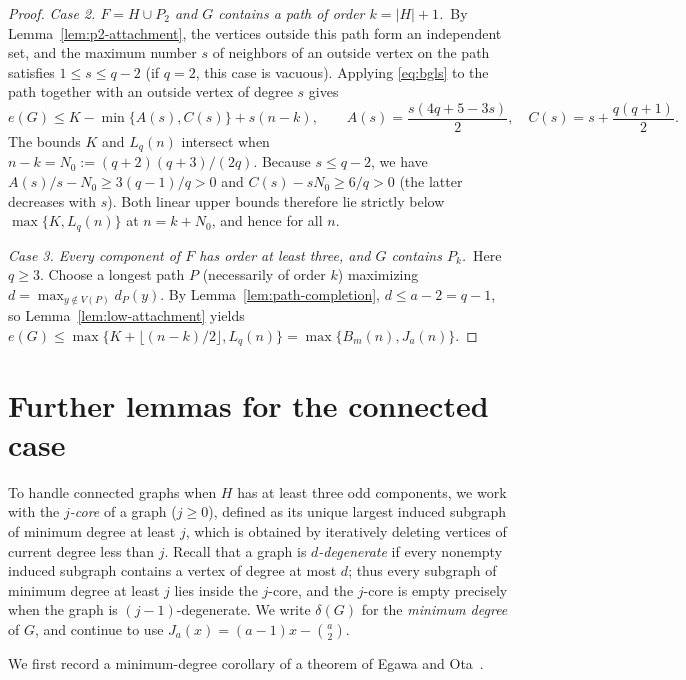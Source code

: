 \documentclass[10pt]{article}
\theoremstyle{compactplain}
\theoremstyle{remark}\newtheorem{remark}[theorem]{Remark}
\begin{document}
\begin{proof}
\medskip\noindent\emph{Case 2. $F=H\cup P_2$ and $G$ contains a path of
order $k=|H|+1$.}\ 
By Lemma~\ref{lem:p2-attachment}, the vertices outside this path form an
independent set, and the maximum number $s$ of neighbors of an outside
vertex on the path satisfies $1\le s\le q-2$ (if $q=2$, this case is
vacuous). Applying \eqref{eq:bgls} to the path together with an outside
vertex of degree $s$ gives
\[
 e(G)\le K-\min\{A(s),C(s)\}+s(n-k),\qquad
 A(s)=\frac{s(4q+5-3s)}{2},\quad C(s)=s+\frac{q(q+1)}{2}.
\]
The bounds $K$ and $L_q(n)$ intersect when $n-k=N_0:=(q+2)(q+3)/(2q)$.
Because $s\le q-2$, we have $A(s)/s-N_0\ge3(q-1)/q>0$ and
$C(s)-sN_0\ge6/q>0$ (the latter decreases with $s$). Both linear upper
bounds therefore lie strictly below $\max\{K,L_q(n)\}$ at $n=k+N_0$, and
hence for all $n$.

\medskip\noindent\emph{Case 3. Every component of $F$ has order at
least three, and $G$ contains $P_k$.}\ 
Here $q\ge3$. Choose a longest path $P$ (necessarily of order $k$)
maximizing $d=\max_{y\notin V(P)}d_P(y)$. By
Lemma~\ref{lem:path-completion}, $d\le a-2=q-1$, so
Lemma~\ref{lem:low-attachment} yields
$e(G)\le\max\{K+\lfloor(n-k)/2\rfloor,L_q(n)\}=\max\{B_m(n),J_a(n)\}$.
\end{proof}

\section{Further lemmas for the connected case}\label{sec:coretools}

To handle connected graphs when $H$ has at least three odd components,
we work with the \emph{$j$-core} of a graph ($j\ge0$), defined as its
unique largest induced subgraph of minimum degree at least $j$, which is
obtained by iteratively deleting vertices of current degree less than
$j$. Recall that a graph is \emph{$d$-degenerate} if every nonempty
induced subgraph contains a vertex of degree at most $d$; thus every
subgraph of minimum degree at least $j$ lies inside the $j$-core, and
the $j$-core is empty precisely when the graph is $(j-1)$-degenerate. We
write $\delta(G)$ for the \emph{minimum degree} of $G$, and continue to
use $J_a(x)=(a-1)x-\binom{a}{2}$.

We first record a minimum-degree corollary of a theorem of Egawa and
Ota~\cite{EO}.
\end{document}
